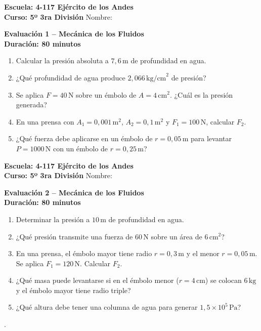 \documentclass[10pt]{article}
\begin{document}
\begin{tcolorbox}[mybox]
\textbf{Escuela: 4-117 Ejército de los Andes} \\
\textbf{Curso: 5º 3ra División} \hfill Nombre: \hrulefill

\vspace{1mm}
\textbf{Evaluación 1 – Mecánica de los Fluidos} \\
\textbf{Duración: 80 minutos}

\begin{enumerate}
\item Calcular la presión absoluta a $7{,}6\,\text{m}$ de profundidad en agua.
\item ¿Qué profundidad de agua produce $2{,}066\,\text{kg/cm}^2$ de presión?
\item Se aplica $F=40\,\text{N}$ sobre un émbolo de $A=4\,\text{cm}^2$. ¿Cuál es la presión generada?
\item En una prensa con $A_1=0{,}001\,\text{m}^2$, $A_2=0{,}1\,\text{m}^2$ y $F_1=100\,\text{N}$, calcular $F_2$.
\item ¿Qué fuerza debe aplicarse en un émbolo de $r=0{,}05\,\text{m}$ para levantar $P=1000\,\text{N}$ con un émbolo de $r=0{,}25\,\text{m}$?
\end{enumerate}
\end{tcolorbox}
\hfill
\begin{tcolorbox}[mybox]
\textbf{Escuela: 4-117 Ejército de los Andes} \\
\textbf{Curso: 5º 3ra División} \hfill Nombre: \hrulefill

\vspace{1mm}
\textbf{Evaluación 2 – Mecánica de los Fluidos} \\
\textbf{Duración: 80 minutos}


\begin{enumerate}
\item Determinar la presión a $10\,\text{m}$ de profundidad en agua.
\item ¿Qué presión transmite una fuerza de $60\,\text{N}$ sobre un área de $6\,\text{cm}^2$?
\item En una prensa, el émbolo mayor tiene radio $r=0{,}3\,\text{m}$ y el menor $r=0{,}05\,\text{m}$. Se aplica $F_1=120\,\text{N}$. Calcular $F_2$.
\item ¿Qué masa puede levantarse si en el émbolo menor ($r=4\,\text{cm}$) se colocan $6\,\text{kg}$ y el émbolo mayor tiene radio triple?
\item ¿Qué altura debe tener una columna de agua para generar $1{,}5\times10^5\,\text{Pa}$?
\end{enumerate}
.
\end{tcolorbox}
\end{document}
